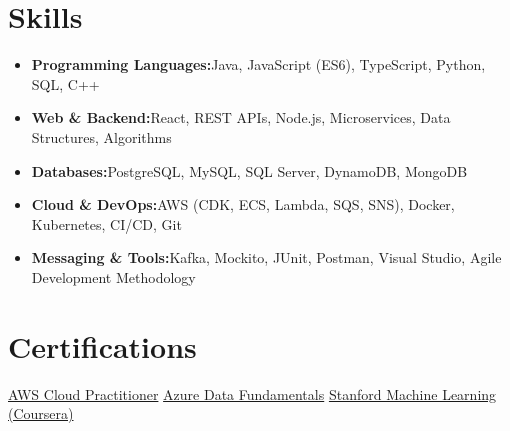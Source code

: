 \documentclass[a4paper,10pt]{article}
\newcommand{\resumeItem}[2]{\item{\textbf{#1}{\hspace{0.5mm}#2 \vspace{-0.5mm}}}}
\newcommand{\resumeSubItem}[2]{\resumeItem{#1}{#2}\vspace{-3pt}}
\newcommand{\resumeHeadingSkillStart}{\begin{itemize}[leftmargin=*, itemsep=0.6mm, rightmargin=2ex]}
\newcommand{\resumeHeadingSkillEnd}{\end{itemize}\vspace{-2mm}}
\begin{document}
\section{\textbf{Skills}}
\resumeHeadingSkillStart
\resumeSubItem{Programming Languages:}{Java, JavaScript (ES6), TypeScript, Python, SQL, C++}
\resumeSubItem{Web \& Backend:}{React, REST APIs, Node.js, Microservices, Data Structures, Algorithms}
\resumeSubItem{Databases:}{PostgreSQL, MySQL, SQL Server, DynamoDB, MongoDB}
\resumeSubItem{Cloud \& DevOps:}{AWS (CDK, ECS, Lambda, SQS, SNS), Docker, Kubernetes, CI/CD, Git}
\resumeSubItem{Messaging \& Tools:}{Kafka, Mockito, JUnit, Postman, Visual Studio, Agile Development Methodology}
\resumeHeadingSkillEnd
\vspace{0mm}

\section{\textbf{Certifications}}
\footnotesize{
\href{https://drive.google.com/file/d/1a3exoiS79RS3q8vSJHT-PpkczSPg54EZ/view}{AWS Cloud Practitioner} \hfill \href{https://drive.google.com/file/d/1VBJjfRMsIm8BckoUtLUV7ZbY88Jju2qT/view}{Azure Data Fundamentals} \hfill \href{https://drive.google.com/file/d/1At3BLkqJ9vuhPPUCcrNAw9yNH5li7XdQ/view}{Stanford Machine Learning (Coursera)}
}
\end{document}

